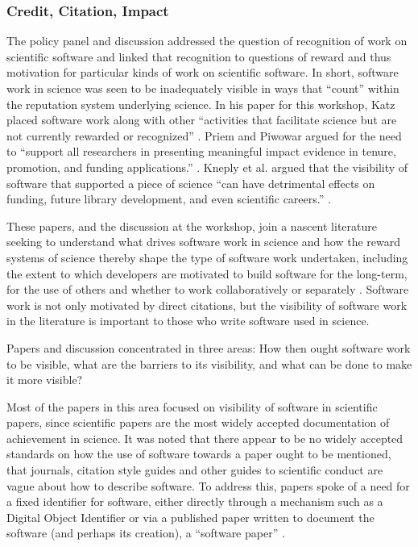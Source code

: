 \documentclass[11pt, oneside]{amsart}
\begin{document}
\subsubsection*{Credit, Citation, Impact}

The policy panel and discussion addressed the question of recognition of work on scientific software and linked that recognition to questions of reward and thus motivation for particular kinds of work on scientific software. In short, software work in science was seen to be inadequately visible in ways that ``count'' within the reputation system underlying science. In his paper for this workshop, Katz placed software work along with other ``activities that facilitate science but are not currently rewarded or recognized'' \cite{Katz_WSSSPE}. Priem and Piwowar argued for the need to ``support all researchers in presenting meaningful impact evidence in tenure, promotion, and funding applications.'' \cite{Priem_WSSSPE}.  Kneply et al. argued that the visibility of software that supported a piece of science ``can have detrimental effects on funding, future library development, and even scientific careers.'' \cite{Knepley_WSSSPE}.

These papers, and the discussion at the workshop, join a nascent literature seeking to understand what drives software work in science and how the reward systems of science thereby shape the type of software work undertaken, including the extent to which developers are motivated to build software for the long-term, for the use of others and whether to work collaboratively or separately \cite{howison_incentives_2013, howison_scientific_2011, bietz_synergizing_2010}. Software work is not only motivated by direct citations, but the visibility of software work in the literature is important to those who write software used in science.

Papers and discussion concentrated in three areas: How then ought software work to be visible, what are the barriers to its visibility, and what can be done to make it more visible? 

Most of the papers in this area focused on visibility of software in scientific papers, since scientific papers are the most widely accepted documentation of achievement in science. It was noted that there appear to be no widely accepted standards on how the use of software towards a paper ought to be mentioned, that journals, citation style guides and other guides to scientific conduct are vague about how to describe software. To address this, papers spoke of a need for a fixed identifier for software, either directly through a mechanism such as a Digital Object Identifier \cite{Katz_WSSSPE,Knepley_WSSSPE} or via a published paper written to document the software (and perhaps its creation), a ``software paper'' \cite{Chue_Hong_WSSSPE}.
\end{document}

